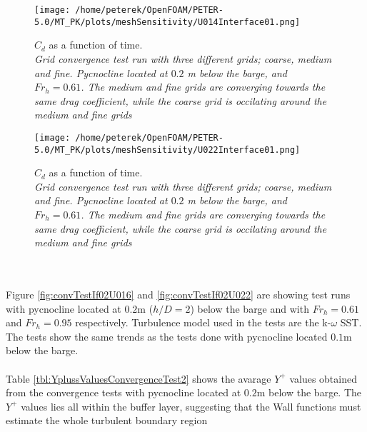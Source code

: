 \documentclass[a4paper, 12pt]{report}
\begin{document}
\begin{minipage}{.45\textwidth} 
	\begin{figure}[H]
		\centering
		\texttt{[image: /home/peterek/OpenFOAM/PETER-5.0/MT\_PK/plots/meshSensitivity/U014Interface01.png]}
		\caption{$C_d$ as a function of time. \\ \textit{Grid convergence test run with three different grids; coarse, medium and fine. Pycnocline located at $0.2$ m below the barge, and $Fr_h = 0.61$. The medium and fine grids are converging towards the same drag coefficient, while the coarse grid is occilating around the medium and fine grids}}
		\label{fig:convTestIf01U01}
	\end{figure}
\end{minipage}\hfill
\vspace{2ex}
\begin{minipage}{.45\textwidth} 
	\begin{figure}[H]
		\centering
		\texttt{[image: /home/peterek/OpenFOAM/PETER-5.0/MT\_PK/plots/meshSensitivity/U022Interface01.png]}
		\caption{$C_d$ as a function of time. \\ \textit{Grid convergence test run with three different grids; coarse, medium and fine. Pycnocline located at $0.2$ m below the barge, and $Fr_h = 0.61$. The medium and fine grids are converging towards the same drag coefficient, while the coarse grid is occilating around the medium and fine grids}}
		\label{fig:convTestIf01U022}
	\end{figure}
\end{minipage}\hfill
\vspace{2ex}\\
\\
Figure \ref{fig:convTestIf02U016} and \ref{fig:convTestIf02U022} are showing test runs with pycnocline located at $0.2$m ($h/D=2$) below the barge and with $Fr_h = 0.61$ and $Fr_h = 0.95$ respectively. Turbulence model used in the tests are the k-$\omega$ SST. The tests show the same trends as the tests done with pycnocline located $0.1$m below the barge.\\
\\
Table \ref{tbl:YplussValuesConvergenceTest2} shows the avarage $Y^+$ values obtained from the convergence tests with pycnocline located at $0.2$m below the barge. The $Y^+$ values lies all within the buffer layer, suggesting that the Wall functions must estimate the whole turbulent boundary region
\end{document}
